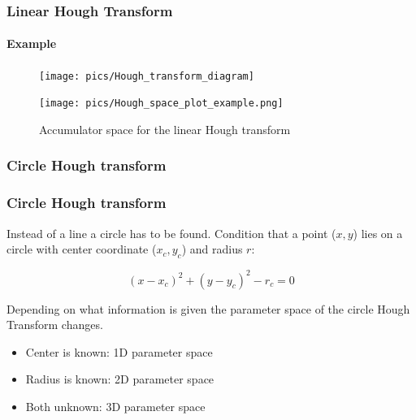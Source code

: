 \documentclass[10pt, xcolor={table}]{beamer}
\begin{document}
\begin{frame}
  \frametitle{Linear Hough Transform}
  \framesubtitle{Example}
  \vspace*{\fill}
  \begin{figure}
  \centering
    \texttt{[image: pics/Hough\_transform\_diagram]}
  \end{figure}
    \vspace{\fill}

    \tiny {}

\framebreak
\vspace*{\fill}
  \begin{figure}
    \texttt{[image: pics/Hough\_space\_plot\_example.png]}
    \caption{Accumulator space for the linear Hough transform}
  \end{figure}

  \vspace{\fill}
  \tiny{}
  
\end{frame}


\subsubsection{Circle Hough transform} %
\label{ssub:circle_hough_transform}

\begin{frame}[c]\frametitle{Circle Hough transform}

Instead of a line a circle has to be found. Condition that a point ($x,y$) lies on a circle with
center coordinate ($x_c,y_c$) and radius $r$:

\begin{equation}
  (x-x_c)^2 + (y-y_c)^2 - r_c = 0
\end{equation}

Depending on what information is given the parameter space of the circle Hough Transform changes.
\begin{itemize}
  \item Center is known: 1D parameter space
  \item Radius is known: 2D parameter space
  \item Both unknown: 3D parameter space
\end{itemize}
\end{frame}
\end{document}
